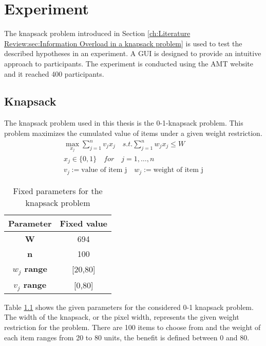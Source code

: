 
\chapter{Experiment}
\label{ch:Experiment}

The knapsack problem introduced in Section \ref{ch:Literature Review:sec:Information Overload in a knapsack problem} is used to test the described hypotheses in an experiment. A \ac{GUI} is designed to provide an intuitive approach to participants. The experiment is conducted using the \ac{AMT} website and it reached 400 participants.

\section{Knapsack}
\label{ch:Experiment:sec:Knapsack}

The knapsack problem used in this thesis is the 0-1-knapsack problem. This problem maximizes the cumulated value of items under a given weight restriction.
\begin{equation}
\begin{split}
\max\limits_{x_j} \sum_{j=1}^{n} v_j x_j \quad
s.t. \sum_{j=1}^{n} w_j x_j \leq W \quad \\
x_j \in \{0,1\} \quad for \quad j = 1, \dots, n \\
v_j := \text{value of item j} \quad w_j := \text{weight of item j}
\end{split}
\end{equation}
\begin{table}[b] %
  \centering
    \begin{tabular}{c|c}
    \textbf{Parameter} & \multicolumn{1}{c}{\textbf{Fixed value}} \bigstrut[b]\\
    \hline
    \textbf{W} & 694 \bigstrut\\
    \hline
    \textbf{n} & 100 \bigstrut\\
    \hline
    \textbf{$w_j$ range} & \multicolumn{1}{c}{[20,80]} \bigstrut\\
    \hline
    \textbf{$v_j$ range} & \multicolumn{1}{c}{[0,80]} \bigstrut\\
    \hline
    \end{tabular}%
  \caption{Fixed parameters for the knapsack problem}
    \label{tab:KnapsackParamters}
\end{table}%
Table \ref{tab:KnapsackParamters} shows the given parameters for the considered 0-1 knapsack problem. The width of the knapsack, or the pixel width, represents the given weight restriction for the problem. There are 100 items to choose from and the weight of each item ranges from 20 to 80 units, the benefit is defined between 0 and 80.

